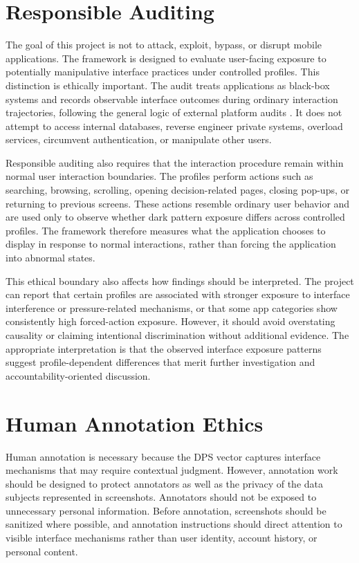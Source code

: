 \section{Responsible Auditing}

The goal of this project is not to attack, exploit, bypass, or disrupt mobile applications. The framework is designed to evaluate user-facing exposure to potentially manipulative interface practices under controlled profiles. This distinction is ethically important. The audit treats applications as black-box systems and records observable interface outcomes during ordinary interaction trajectories, following the general logic of external platform audits \cite{sandvig2014auditing,hannak2013personalization}. It does not attempt to access internal databases, reverse engineer private systems, overload services, circumvent authentication, or manipulate other users.

Responsible auditing also requires that the interaction procedure remain within normal user interaction boundaries. The profiles perform actions such as searching, browsing, scrolling, opening decision-related pages, closing pop-ups, or returning to previous screens. These actions resemble ordinary user behavior and are used only to observe whether dark pattern exposure differs across controlled profiles. The framework therefore measures what the application chooses to display in response to normal interactions, rather than forcing the application into abnormal states.

This ethical boundary also affects how findings should be interpreted. The project can report that certain profiles are associated with stronger exposure to interface interference or pressure-related mechanisms, or that some app categories show consistently high forced-action exposure. However, it should avoid overstating causality or claiming intentional discrimination without additional evidence. The appropriate interpretation is that the observed interface exposure patterns suggest profile-dependent differences that merit further investigation and accountability-oriented discussion.

\section{Human Annotation Ethics}

Human annotation is necessary because the DPS vector captures interface mechanisms that may require contextual judgment. However, annotation work should be designed to protect annotators as well as the privacy of the data subjects represented in screenshots. Annotators should not be exposed to unnecessary personal information. Before annotation, screenshots should be sanitized where possible, and annotation instructions should direct attention to visible interface mechanisms rather than user identity, account history, or personal content.

